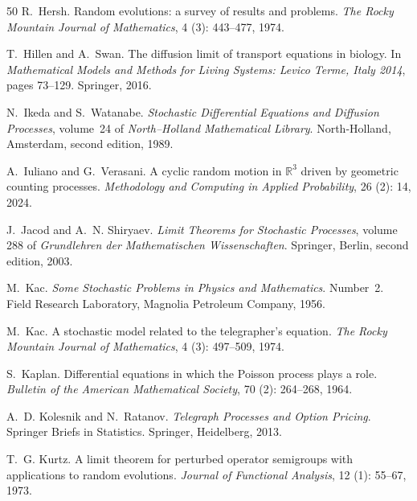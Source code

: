 \documentclass[10pt]{article}
\newcommand{\1}{1\!\!\!\;{\rm I}}
\theoremstyle{plain}
\theoremstyle{definition}
\numberwithin{equation}{section}
\begin{document}
\begin{thebibliography}{50}
R.~Hersh.
\newblock Random evolutions: a survey of results and problems.
\newblock \emph{The Rocky Mountain Journal of Mathematics}, 4
  (3): 443--477, 1974.

T.~Hillen and A.~Swan.
\newblock The diffusion limit of transport equations in biology.
\newblock In \emph{Mathematical Models and Methods for Living Systems: Levico
  Terme, Italy 2014}, pages 73--129. Springer, 2016.

N.~Ikeda and S.~Watanabe.
\newblock \emph{{Stochastic Differential Equations and Diffusion Processes}},
  volume~24 of \emph{{North--Holland Mathematical Library}}.
\newblock North-Holland, Amsterdam, second edition, 1989.

A.~Iuliano and G.~Verasani.
\newblock A cyclic random motion in $\mathbb{R}^3$ driven by geometric counting
  processes.
\newblock \emph{Methodology and Computing in Applied Probability}, 26
  (2): 14, 2024.

J.~Jacod and A.~N. Shiryaev.
\newblock \emph{{Limit Theorems for Stochastic Processes}}, volume 288 of
  \emph{{Grundlehren der Mathematischen Wissenschaften}}.
\newblock Springer, Berlin, second edition, 2003.

M.~Kac.
\newblock \emph{Some Stochastic Problems in Physics and Mathematics}.
\newblock Number~2. Field Research Laboratory, Magnolia Petroleum Company,
  1956.

M.~Kac.
\newblock A stochastic model related to the telegrapher's equation.
\newblock \emph{The Rocky Mountain Journal of Mathematics}, 4
  (3): 497--509, 1974.

S.~Kaplan.
\newblock Differential equations in which the {P}oisson process plays a role.
\newblock \emph{Bulletin of the American Mathematical Society}, 70
  (2): 264--268, 1964.

A.~D. Kolesnik and N.~Ratanov.
\newblock \emph{Telegraph Processes and Option Pricing}.
\newblock Springer Briefs in Statistics. Springer, Heidelberg, 2013.

T.~G. Kurtz.
\newblock A limit theorem for perturbed operator semigroups with applications
  to random evolutions.
\newblock \emph{Journal of Functional Analysis}, 12 (1):
  55--67, 1973.


\end{thebibliography}
\end{document}
